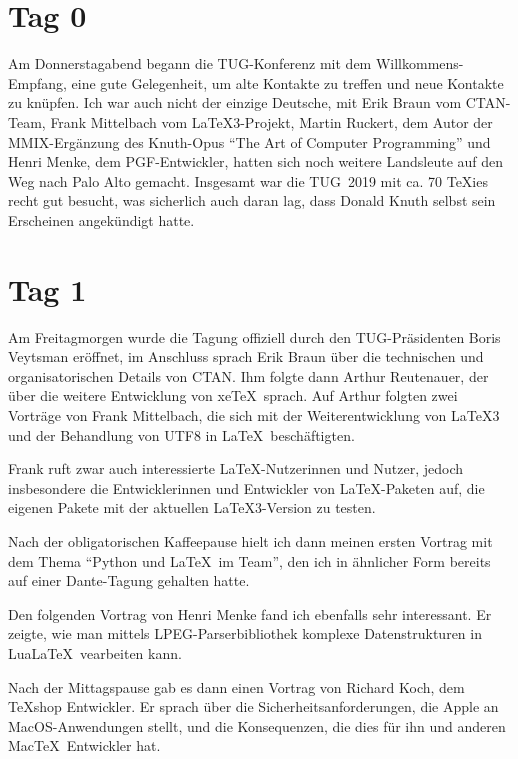 \documentclass[ngerman]{dtk}
\begin{document}
\section{Tag 0}

Am Donnerstagabend begann die TUG-Konferenz mit dem Willkommens-Empfang, eine gute Gelegenheit, um alte Kontakte zu treffen und neue Kontakte zu knüpfen. Ich war auch nicht der einzige Deutsche, mit Erik Braun vom CTAN-Team, Frank Mittelbach vom \LaTeX 3-Projekt, Martin Ruckert, dem Autor der MMIX-Ergänzung des Knuth-Opus \enquote{The Art of Computer Programming} und Henri Menke, dem PGF-Entwickler, hatten sich noch weitere Landsleute auf den Weg nach Palo Alto gemacht. Insgesamt war die TUG~2019 mit ca. 70 \TeX ies recht gut besucht, was sicherlich auch daran lag, dass Donald Knuth selbst sein Erscheinen angekündigt hatte.

\section{Tag 1}

Am Freitagmorgen wurde die Tagung offiziell durch den TUG-Präsidenten Boris Veytsman eröffnet, im Anschluss sprach Erik Braun über die technischen und organisatorischen Details von CTAN. Ihm folgte dann Arthur Reutenauer, der über die weitere Entwicklung von xe\TeX\ sprach. Auf Arthur folgten zwei Vorträge von Frank Mittelbach, die sich mit der Weiterentwicklung von \LaTeX 3 und der Behandlung von UTF8 in \LaTeX\ beschäftigten.

Frank ruft zwar auch interessierte \LaTeX-Nutzerinnen und Nutzer, jedoch insbesondere die Entwicklerinnen und Entwickler von \LaTeX-Paketen auf, die eigenen Pakete mit der aktuellen \LaTeX3-Version zu testen.



Nach der obligatorischen Kaffeepause hielt ich dann meinen ersten Vortrag mit dem Thema \enquote{Python und \LaTeX\ im Team}, den ich in ähnlicher Form bereits auf einer Dante-Tagung gehalten hatte.

Den folgenden Vortrag von Henri Menke fand ich ebenfalls sehr interessant. Er zeigte, wie man mittels LPEG-Parserbibliothek komplexe Datenstrukturen in Lua\LaTeX\ vearbeiten kann. 

Nach der Mittagspause gab es dann einen Vortrag von Richard Koch, dem \TeX shop Entwickler. Er sprach über die Sicherheitsanforderungen, die Apple an MacOS-Anwendungen stellt, und die Konsequenzen, die dies für ihn und anderen Mac\TeX\ Entwickler hat.
\end{document}
